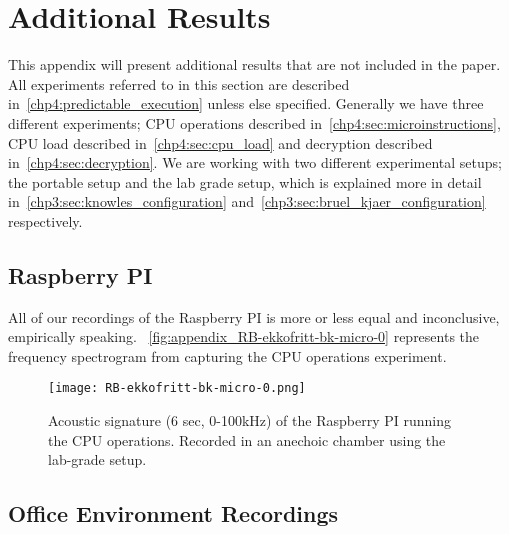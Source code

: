 \chapter{Additional Results}\label{apx:results}
This appendix will present additional results that are not included in the paper.
All experiments referred to in this section are described in~\autoref{chp4:predictable_execution} unless else specified. 
Generally we have three different experiments; CPU operations described in~\autoref{chp4:sec:microinstructions}, CPU load described in~\autoref{chp4:sec:cpu_load} and decryption described in~\autoref{chp4:sec:decryption}. 
We are working with two different experimental setups; the portable setup and the lab grade setup, which is explained more in detail in~\autoref{chp3:sec:knowles_configuration} and~\autoref{chp3:sec:bruel_kjaer_configuration} respectively.


\section{Raspberry PI}\label{apx:sec:raspberry}
All of our recordings of the Raspberry PI is more or less equal and inconclusive, empirically speaking. 
~\autoref{fig:appendix_RB-ekkofritt-bk-micro-0} represents the frequency spectrogram from capturing the CPU operations experiment. 
\begin{figure}[ht]
    \centering
    \texttt{[image: RB-ekkofritt-bk-micro-0.png]}
    \caption{Acoustic signature (6 sec, 0-100kHz) of the Raspberry PI running the CPU operations.
        Recorded in an anechoic chamber using the lab-grade setup.}
    \label{fig:appendix_RB-ekkofritt-bk-micro-0}
\end{figure}


\section{Office Environment Recordings}

